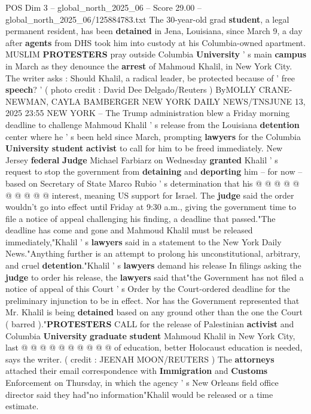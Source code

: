 \begin{textsample}{POS Dim 3 – global\_north\_2025\_06 – Score 29.00 – global\_north\_2025\_06/125884783.txt}  \label{ex:f3_pos_092}
The 30-year-old grad \textbf{student}, a legal permanent resident, has been \textbf{detained} in Jena, Louisiana, since March 9, a day after \textbf{agents} from DHS took him into custody at his Columbia-owned apartment.
MUSLIM \textbf{PROTESTERS} pray outside Columbia \textbf{University} ' s main \textbf{campus} in March as they denounce the \textbf{arrest} of Mahmoud Khalil, in New York City.
The writer asks : Should Khalil, a radical leader, be protected because of ' free \textbf{speech}? ' ( photo credit : David Dee Delgado/Reuters ) ByMOLLY CRANE-NEWMAN, CAYLA BAMBERGER NEW YORK DAILY NEWS/TNSJUNE 13, 2025 23:55 NEW YORK -- The Trump administration blew a Friday morning deadline to challenge Mahmoud Khalil ' s release from the Louisiana \textbf{detention} center where he ' s been held since March, prompting \textbf{lawyers} for the Columbia \textbf{University} \textbf{student} \textbf{activist} to call for him to be freed immediately.
New Jersey \textbf{federal} \textbf{Judge} Michael Farbiarz on Wednesday \textbf{granted} Khalil ' s request to stop the government from \textbf{detaining} and \textbf{deporting} him -- for now -- based on Secretary of State Marco Rubio ' s determination that his @ @ @ @ @ @ @ @ @ @ interest, meaning US support for Israel.
The \textbf{judge} said the order wouldn't go into effect until Friday at 9:30 a.m., giving the government time to file a notice of appeal challenging his finding, a deadline that passed."The deadline has come and gone and Mahmoud Khalil must be released immediately,"Khalil ' s \textbf{lawyers} said in a statement to the New York Daily News."Anything further is an attempt to prolong his unconstitutional, arbitrary, and cruel \textbf{detention}."Khalil ' s \textbf{lawyers} demand his release In filings asking the \textbf{judge} to order his release, the \textbf{lawyers} said that"the Government has not filed a notice of appeal of this Court ' s Order by the Court-ordered deadline for the preliminary injunction to be in effect.
Nor has the Government represented that Mr.
Khalil is being \textbf{detained} based on any ground other than the one the Court ( barred )."\textbf{PROTESTERS} CALL for the release of Palestinian \textbf{activist} and Columbia \textbf{University} \textbf{graduate} \textbf{student} Mahmoud Khalil in New York City, last @ @ @ @ @ @ @ @ @ @ of education, better Holocaust education is needed, says the writer. ( credit : JEENAH MOON/REUTERS ) The \textbf{attorneys} attached their email correspondence with \textbf{Immigration} and \textbf{Customs} Enforcement on Thursday, in which the agency ' s New Orleans field office director said they had"no information"Khalil would be released or a time estimate.

\end{textsample}
